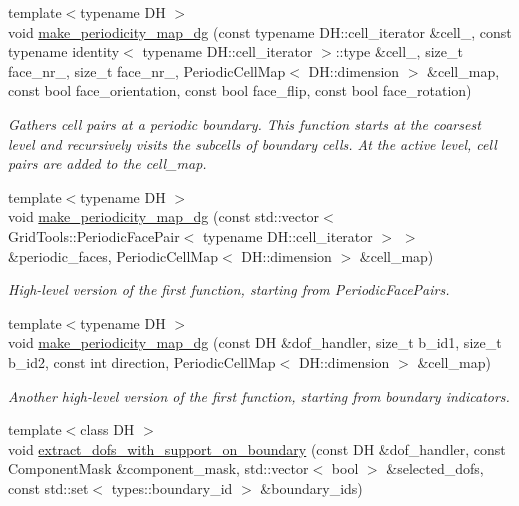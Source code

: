 \begin{DoxyCompactItemize}
\item 
{\footnotesize template$<$typename DH $>$ }\\void \hyperlink{namespacenatrium_1_1DealIIExtensions_a6bc5b9999ee7c47791ea8754f586277e}{make\_\-periodicity\_\-map\_\-dg} (const typename DH::cell\_\-iterator \&cell\_, const typename identity$<$ typename DH::cell\_\-iterator $>$::type \&cell\_, size\_\-t face\_\-nr\_, size\_\-t face\_\-nr\_, PeriodicCellMap$<$ DH::dimension $>$ \&cell\_\-map, const bool face\_\-orientation, const bool face\_\-flip, const bool face\_\-rotation)
\begin{DoxyCompactList}\small\item\em Gathers cell pairs at a periodic boundary. This function starts at the coarsest level and recursively visits the subcells of boundary cells. At the active level, cell pairs are added to the cell\_\-map. \item\end{DoxyCompactList}\item 
{\footnotesize template$<$typename DH $>$ }\\void \hyperlink{namespacenatrium_1_1DealIIExtensions_a02ccc2d5be9d7550b75fa196aeb71656}{make\_\-periodicity\_\-map\_\-dg} (const std::vector$<$ GridTools::PeriodicFacePair$<$ typename DH::cell\_\-iterator $>$ $>$ \&periodic\_\-faces, PeriodicCellMap$<$ DH::dimension $>$ \&cell\_\-map)
\begin{DoxyCompactList}\small\item\em High-\/level version of the first function, starting from PeriodicFacePairs. \item\end{DoxyCompactList}\item 
{\footnotesize template$<$typename DH $>$ }\\void \hyperlink{namespacenatrium_1_1DealIIExtensions_a01f414566020f59f29036fd7e22341b9}{make\_\-periodicity\_\-map\_\-dg} (const DH \&dof\_\-handler, size\_\-t b\_\-id1, size\_\-t b\_\-id2, const int direction, PeriodicCellMap$<$ DH::dimension $>$ \&cell\_\-map)
\begin{DoxyCompactList}\small\item\em Another high-\/level version of the first function, starting from boundary indicators. \item\end{DoxyCompactList}\item 
{\footnotesize template$<$class DH $>$ }\\void \hyperlink{namespacenatrium_1_1DealIIExtensions_ad74bfc63a45e2d4c1c9f2dd625cf1a66}{extract\_\-dofs\_\-with\_\-support\_\-on\_\-boundary} (const DH \&dof\_\-handler, const ComponentMask \&component\_\-mask, std::vector$<$ bool $>$ \&selected\_\-dofs, const std::set$<$ types::boundary\_\-id $>$ \&boundary\_\-ids)

\end{DoxyCompactItemize}
